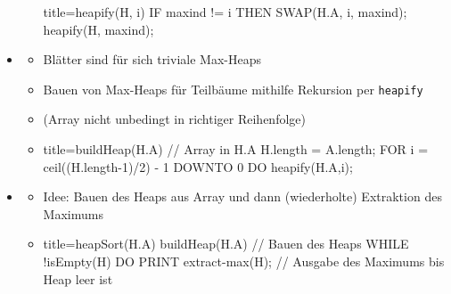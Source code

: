 \documentclass[
    12pt,
    a4paper,
    ngerman,
    color=3b,%
    marginpar=false,
    colorback=false,
    leqno,
]{tudaexercise}
\begin{document}
\begin{itemize}
\begin{itemize}
\begin{ccode}[autogobble]{title={heapify(H, i)}}
                    IF maxind != i THEN
                        SWAP(H.A, i, maxind);
                        heapify(H, maxind);
                    \end{ccode}
            \end{itemize}

        \item {}
            \begin{itemize}
                \item Blätter sind für sich triviale Max-Heaps
                \item Bauen von Max-Heaps für Teilbäume mithilfe Rekursion per \texttt{heapify} 
                \item (Array nicht unbedingt in richtiger Reihenfolge)
                \item[]
                    \begin{ccode}[autogobble]{title={buildHeap(H.A) // Array in H.A}}
                    H.length = A.length;
                    FOR i = ceil((H.length-1)/2) - 1 DOWNTO 0 DO
                        heapify(H.A,i);
                    \end{ccode}
            \end{itemize}

        \item {}
            \begin{itemize}
                \item Idee: Bauen des Heaps aus Array und dann (wiederholte) Extraktion des Maximums
                \item[]
                    \begin{ccode}[autogobble]{title={heapSort(H.A)}}
                    buildHeap(H.A)                  // Bauen des Heaps
                    WHILE !isEmpty(H) DO
                        PRINT extract-max(H);       // Ausgabe des Maximums bis Heap leer ist
                    \end{ccode}
            \end{itemize}
    \end{itemize}
    \clearpage
\end{document}
